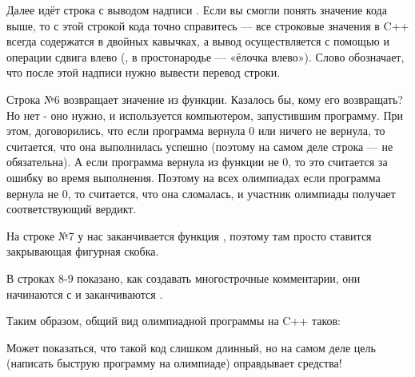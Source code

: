 Далее идёт строка с выводом надписи . Если вы смогли понять значение кода выше, то с этой строкой кода точно справитесь — все строковые значения в C++ всегда содержатся в двойных кавычках, а вывод осуществляется с помощью  и операции сдвига влево (\lcpp{<<}, в простонародье — «ёлочка влево»). Слово  обозначает, что после этой надписи нужно вывести перевод строки.

Строка №6 возвращает значение из функции. Казалось бы, кому его возвращать? Но нет - оно нужно, и используется компьютером, запустившим программу. При этом, договорились, что если программа вернула 0 или ничего не вернула, то считается, что она выполнилась успешно (поэтому на самом деле строка  — не обязательна). А если программа вернула из функции  не 0, то это считается за ошибку во время выполнения. Поэтому на всех олимпиадах если программа вернула не 0, то считается, что она сломалась, и участник олимпиады получает соответствующий вердикт.

На строке №7 у нас заканчивается функция , поэтому там просто ставится закрывающая фигурная скобка.

В строках 8-9 показано, как создавать многострочные комментарии, они начинаются с \lcpp{/*} и заканчиваются \lcpp{*/}.

Таким образом, общий вид олимпиадной программы на C++ таков:


Может показаться, что такой код слишком длинный, но на самом деле цель (написать быструю программу на олимпиаде) оправдывает средства!
